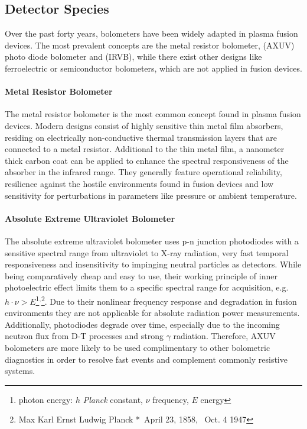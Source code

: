         \subsection{Detector Species}\label{subsec:detectoradvant}%
%
            Over the past forty years\cite{Husan1975}, bolometers have been widely adapted in plasma fusion devices. The most prevalent concepts are the metal resistor bolometer,  (AXUV) photo diode bolometer and  (IRVB), while there exist other designs like ferroelectric\cite{Maio1997} or semiconductor\cite{Iborra1993} bolometers, which are not applied in fusion devices.%
%
            \paragraph{Metal Resistor Bolometer}%

                The metal resistor bolometer is the most common concept found in plasma fusion devices. Modern designs consist of highly sensitive thin metal film absorbers, residing on electrically non-conductive thermal transmission layers that are connected to a metal resistor. Additional to the thin metal film, a nanometer thick carbon coat can be applied to enhance the spectral responsiveness of the absorber in the infrared range\cite{Zhang2010}. They generally feature operational reliability, resilience against the hostile environments found in fusion devices and low sensitivity for perturbations in parameters like pressure or ambient temperature\cite{Mueller1984}.%
%
            \paragraph{Absolute Extreme Ultraviolet Bolometer}%

                The absolute extreme ultraviolet bolometer uses p-n junction photodiodes with a sensitive spectral range from ultraviolet to X-ray radiation, very fast temporal responsiveness and insensitivity to impinging neutral particles as detectors.\cite{Furno1999,Degeling2004} While being comparatively cheap and easy to use, their working principle of inner photoelectric effect limits them to a specific spectral range for acquisition, e.g. $h\cdot\nu>E$\footnote[1]{photon energy: $h$ \textit{Planck} constant, $\nu$ frequency, $E$ energy}$^{,}$\footnote[2]{Max Karl Ernst Ludwig Planck *~April 23, 1858, \textdagger~Oct. 4 1947}. Due to their nonlinear frequency response and degradation in fusion environments they are not applicable for absolute radiation power measurements. Additionally, photodiodes degrade over time, especially due to the incoming neutron flux from D-T processes and strong $\gamma$ radiation. Therefore, AXUV bolometers are more likely to be used complimentary to other bolometric diagnostics in order to resolve fast events and complement commonly resistive systems.\cite{Bernert2014}
%
